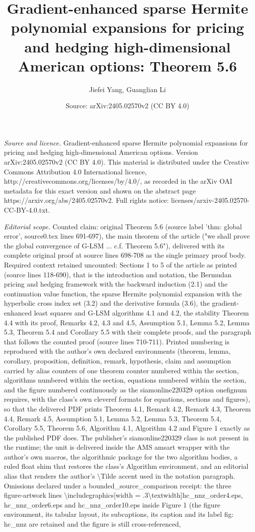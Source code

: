 \documentclass[10pt,a4paper]{amsart}
\title[Global convergence of gradient-enhanced least squares Monte Carlo]{Gradient-enhanced sparse Hermite polynomial expansions for pricing and hedging high-dimensional American options: Theorem 5.6}
\author{Jiefei Yang, Guanglian Li}
\date{Source: arXiv:2405.02570v2 (CC BY 4.0)}
\numberwithin{equation}{section}
\numberwithin{algorithm}{section}
\theoremstyle{plain}
\theoremstyle{remark}
\begin{document}
\maketitle
{\sloppy\noindent\emph{Source and licence.} Gradient-enhanced sparse Hermite polynomial expansions for pricing and hedging high-dimensional American options. Version arXiv:2405.02570v2 (CC BY 4.0). This material is distributed under the Creative Commons Attribution 4.0 International licence, http://creativecommons.org/licenses/by/4.0/, as recorded in the arXiv OAI metadata for this exact version and shown on the abstract page https://arxiv.org/abs/2405.02570v2. Full rights notice: licenses/arxiv-2405.02570-CC-BY-4.0.txt.\par}\smallskip
\noindent\textit{Editorial scope.} Counted claim: original Theorem 5.6 (source label 'thm: global error', source0.tex lines 691-697), the main theorem of the article ("we shall prove the global convergence of G-LSM ... c.f. Theorem 5.6"), delivered with its complete original proof at source lines 698-708 as the single primary proof body. Required context retained uncounted: Sections 1 to 5 of the article as printed (source lines 118-690), that is the introduction and notation, the Bermudan pricing and hedging framework with the backward induction (2.1) and the continuation value function, the sparse Hermite polynomial expansion with the hyperbolic cross index set (3.2) and the derivative formula (3.6), the gradient-enhanced least squares and G-LSM algorithms 4.1 and 4.2, the stability Theorem 4.4 with its proof, Remarks 4.2, 4.3 and 4.5, Assumption 5.1, Lemma 5.2, Lemma 5.3, Theorem 5.4 and Corollary 5.5 with their complete proofs, and the paragraph that follows the counted proof (source lines 710-711). Printed numbering is reproduced with the author's own declared environments (theorem, lemma, corollary, proposition, definition, remark, hypothesis, claim and assumption carried by alias counters of one theorem counter numbered within the section, algorithms numbered within the section, equations numbered within the section, and the figure numbered continuously as the siamonline220329 option onefignum requires, with the class's own cleveref formats for equations, sections and figures), so that the delivered PDF prints Theorem 4.1, Remark 4.2, Remark 4.3, Theorem 4.4, Remark 4.5, Assumption 5.1, Lemma 5.2, Lemma 5.3, Theorem 5.4, Corollary 5.5, Theorem 5.6, Algorithm 4.1, Algorithm 4.2 and Figure 1 exactly as the published PDF does. The publisher's siamonline220329 class is not present in the runtime; the unit is delivered inside the AMS amsart wrapper with the author's own macros, the algorithmic package for the two algorithm bodies, a ruled float shim that restores the class's Algorithm environment, and an editorial alias that renders the author's \textbackslash{}Tilde accent used in the notation paragraph. Omissions declared under a bounded\_source\_comparison receipt: the three figure-artwork lines \textbackslash{}includegraphics[width = .3\textbackslash{}textwidth]{hc\_nnz\_order4.eps}, {hc\_nnz\_order6.eps} and {hc\_nnz\_order10.eps} inside Figure 1 (the figure environment, its tabular layout, its subcaptions, its caption and its label fig: hc\_nnz are retained and the figure is still cross-referenced, 
\end{document}
